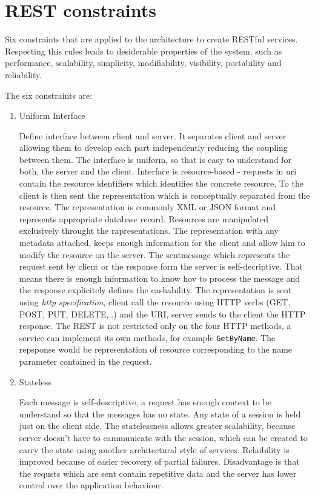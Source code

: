 \section{REST constraints}
\label{sec:constraints}

Six constraints that are applied to the architecture to create RESTful services. Respecting this rules leads to desiderable properties of the system, such as performance, scalability, simplicity, modifiability, visibility, portability and reliability. 
\begin{description}
  \item The six constraints are:
  

\begin{enumerate}
  \item Uniform Interface
  
Define interface between client and server. It separates client and server allowing them to develop each part independently reducing the coupling between them. The interface is uniform, so that is easy to understand for both, the server and the client.
Interface is resource-based - requests in \gls{uri} contain the resource identifiers which identifies the concrete resource. To the client is then sent the representation which is conceptually separated from the resource. The representation is commonly XML or JSON format and represents appropriate database record.
Resources are manipulated exclusively throught the rapresentations. The representation with any metadata attached, keeps enough information for the client and allow him to modify the resource on the server.
The sentmessage which represents the request sent by client or the response form the server is self-decriptive. That means there is enough information to know hov to process the message and the response explicitely defines the cashability.
The representation is sent using \emph{\gls{http} specification}, client call the resource using HTTP verbs (GET, POST, PUT, DELETE,..) and the URI, server sends to the client the HTTP response.
The REST is not restricted only on the four HTTP methods, a service can implement its own methods, for example \texttt{GetByName}. The repsponse would be representation of resource corresponding to the name parameter contained in the request. 

  \item Stateless
  
Each message is self-descriptive, a request has enough context to be understand so that the messages has no state. Any state of a \gls{session} is held just on the client side.
The statelessness allows greater scalability, because server doesn't have to cammunicate with the session, which can be created to carry the state using another architectural style of services. Relaibility is improved because of easier recovery of partial failures. Disadvantage is that the requsts which are sent contain repetitive data and the server has lower control over the application behaviour.


\end{enumerate}
\end{description}
